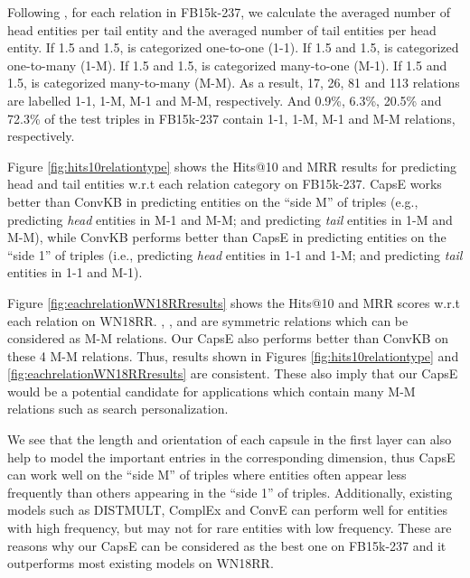 \documentclass[11pt,a4paper]{article}
\begin{document}
Following \citet{NIPS2013_5071}, for each relation  in FB15k-237, we calculate the averaged number  of head entities per tail entity and the averaged number  of tail entities per head entity. 
If 1.5 and 1.5,  is categorized  one-to-one  (1-1).
If 1.5 and 1.5,  is categorized  one-to-many (1-M).
If 1.5 and 1.5,  is categorized  many-to-one (M-1).
If 1.5 and 1.5,  is categorized  many-to-many (M-M). 
As a result, 17, 26, 81 and 113 relations are labelled  1-1, 1-M, M-1 and M-M, respectively. 
And 0.9\%, 6.3\%, 20.5\% and 72.3\% of the test triples in FB15k-237 contain 1-1, 1-M, M-1 and M-M relations, respectively.

Figure \ref{fig:hits10relationtype} shows the Hits@10 and MRR results for predicting head and tail entities w.r.t each relation category on FB15k-237.
CapsE works better than ConvKB in predicting entities on the ``side M'' of triples (e.g., predicting \textit{head} entities in M-1 and M-M; and predicting \textit{tail} entities in 1-M and M-M), while ConvKB performs better than CapsE in predicting entities on the ``side 1'' of triples (i.e., predicting \textit{head} entities in 1-1 and 1-M; and predicting \textit{tail} entities in 1-1 and M-1).



Figure \ref{fig:eachrelationWN18RRresults} shows the Hits@10 and MRR scores w.r.t each relation on WN18RR.
, ,  and  are symmetric relations which can be considered as M-M relations.
Our CapsE also performs better than ConvKB on these 4 M-M relations.
Thus, results shown in Figures \ref{fig:hits10relationtype} and  \ref{fig:eachrelationWN18RRresults} are consistent.
These also imply that our CapsE would be a potential candidate for applications which contain many M-M relations such as search personalization. 

We see that the length and orientation of each capsule in the first layer can also help to model the important entries in the corresponding dimension, thus CapsE can work well on the ``side M'' of triples where entities often appear less frequently than others appearing in the ``side 1'' of triples.
Additionally, existing models such as DISTMULT, ComplEx and ConvE can perform well for entities with high frequency, but may not for rare entities with low frequency.
These are reasons why our CapsE can be considered as the best one on FB15k-237 and it outperforms most existing models on WN18RR.
\end{document}
